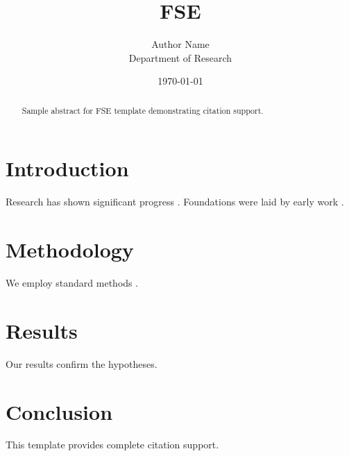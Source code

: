 \documentclass{article}
\title{FSE}
\author{Author Name \\ \small Department of Research}
\date{\today}
\begin{document}
\maketitle

\begin{abstract}
Sample abstract for FSE template demonstrating citation support.
\end{abstract}

\section{Introduction}
Research has shown significant progress \citep{einstein1905}. Foundations were laid by early work \citep{turing1950}.

\section{Methodology}
We employ standard methods \citep{knuth1984}.

\section{Results}
Our results confirm the hypotheses.

\section{Conclusion}
This template provides complete citation support.



\end{document}
